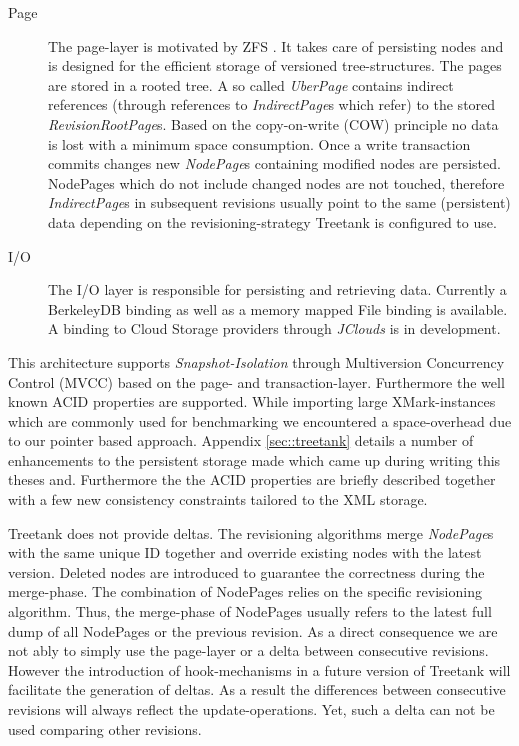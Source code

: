 \begin{description}
\item[Page] The page-layer is motivated by ZFS \cite{ZFS}. It takes care of persisting nodes and is designed for the efficient storage of versioned tree-structures. The pages are stored in a rooted tree. A so called \emph{UberPage} contains indirect references (through references to \emph{IndirectPage}s which refer) to the stored \emph{RevisionRootPage}s. Based on the copy-on-write (COW) principle no data is lost with a minimum space consumption. Once a write transaction commits changes new \emph{NodePage}s containing modified nodes are persisted. NodePages which do not include changed nodes are not touched, therefore \emph{IndirectPage}s in subsequent revisions usually point to the same (persistent) data depending on the revisioning-strategy Treetank is configured to use.

\item[I/O] The I/O layer is responsible for persisting and retrieving data. Currently a BerkeleyDB binding as well as a memory mapped File binding is available. A binding to Cloud Storage providers through \emph{JClouds} is in development.
\end{description}

This architecture supports \emph{Snapshot-Isolation} through Multiversion Concurrency Control (MVCC) based on the page- and transaction-layer. Furthermore the well known ACID properties are supported. While importing large XMark-instances \cite{XMark} which are commonly used for benchmarking we encountered a space-overhead due to our pointer based approach. Appendix \ref{sec::treetank} details a number of enhancements to the persistent storage made which came up during writing this theses and. Furthermore the  the ACID properties are briefly described together with a few new consistency constraints tailored to the XML storage.

Treetank does not provide deltas. The revisioning algorithms merge \emph{NodePage}s with the same unique ID together and override existing nodes with the latest version. Deleted nodes are introduced to guarantee the correctness during the merge-phase. The combination of NodePages relies on the specific revisioning algorithm. Thus, the merge-phase of NodePages usually refers to the latest full dump of all NodePages or the previous revision. As a direct consequence we are not ably to simply use the page-layer or a delta between consecutive revisions. However the introduction of hook-mechanisms in a future version of Treetank will facilitate the generation of deltas. As a result the differences between consecutive revisions will always reflect the update-operations. Yet, such a delta can not be used comparing other revisions.

